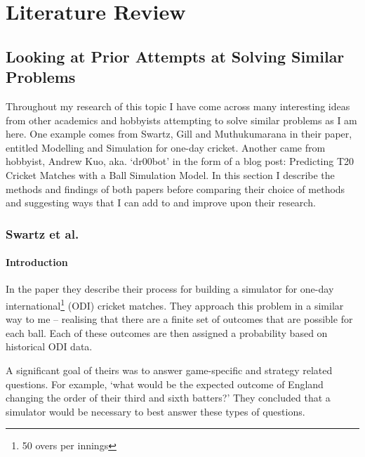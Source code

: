 \titleformat{\chapter}[hang]{\Huge\bfseries}{\thechapter\hsp\textcolor{gray75}{|}\hsp}{0pt}{\Huge\bfseries}
\chapter{Literature Review}

\section{Looking at Prior Attempts at Solving Similar Problems}

Throughout my research of this topic I have come across many interesting ideas from other academics and hobbyists attempting to solve similar problems as I am here. One example comes from Swartz, Gill and Muthukumarana \cite{swartz_modelling_2009} in their paper, entitled Modelling and Simulation for one-day cricket. Another came from hobbyist, Andrew Kuo, aka. ‘dr00bot’ \cite{kuo_predicting_2021} in the form of a blog post: Predicting T20 Cricket Matches with a Ball Simulation Model. In this section I describe the methods and findings of both papers before comparing their choice of methods and suggesting ways that I can add to and improve upon their research.

\subsection{Swartz et al.}

\subsubsection{Introduction}

In the paper they describe their process for building a simulator for one-day international\footnote{50 overs per innings} (ODI) cricket matches. They approach this problem in a similar way to me – realising that there are a finite set of outcomes that are possible for each ball. Each of these outcomes are then assigned a probability based on historical ODI data.

A significant goal of theirs was to answer game-specific and strategy related questions. For example, ‘what would be the expected outcome of England changing the order of their third and sixth batters?’ They concluded that a simulator would be necessary to best answer these types of questions.

